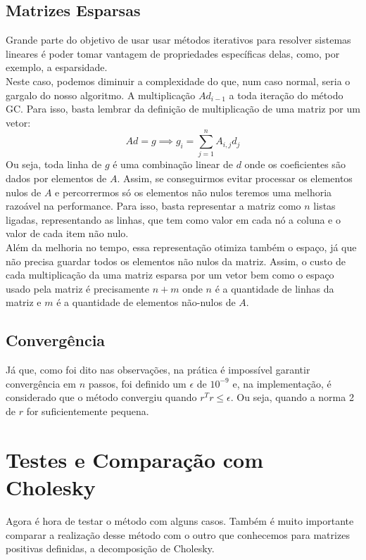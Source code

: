 \documentclass[
10pt, %
a4paper, %
oneside, %
headinclude,footinclude, %
BCOR5mm, %
]{scrartcl}
\begin{document}
\subsection{Matrizes Esparsas}
Grande parte do objetivo de usar usar métodos iterativos para resolver sistemas lineares é poder tomar vantagem de propriedades específicas delas, como, por exemplo, a esparsidade. \\
Neste caso, podemos diminuir a complexidade do que, num caso normal, seria o gargalo do nosso algoritmo. A multiplicação $Ad_{i-1}$ a toda iteração do método GC. Para isso, basta lembrar da definição de multiplicação de uma matriz por um vetor:
$$ Ad = g \implies g_i = \sum\limits_{j=1}^n A_{i,j}d_j $$
Ou seja, toda linha de $g$ é uma combinação linear de $d$ onde os coeficientes são dados por elementos de $A$. Assim, se conseguirmos evitar processar os elementos nulos de $A$ e percorrermos só os elementos não nulos teremos uma melhoria razoável na performance. Para isso, basta representar a matriz como $n$ listas ligadas, representando as linhas, que tem como valor em cada nó a coluna e o valor de cada item não nulo. \\
Além da melhoria no tempo, essa representação otimiza também o espaço, já que não precisa guardar todos os elementos não nulos da matriz. Assim, o custo de cada multiplicação da uma matriz esparsa por um vetor bem como o espaço usado pela matriz é precisamente $n+m$ onde $n$ é a quantidade de linhas da matriz e $m$ é a quantidade de elementos não-nulos de $A$. \\

\subsection{Convergência}
Já que, como foi dito nas observações, na prática é impossível garantir convergência em $n$ passos, foi definido um $\epsilon$ de $10^{-9}$ e, na implementação, é considerado que o método convergiu quando $r^Tr \leq \epsilon$. Ou seja, quando a norma 2 de $r$ for suficientemente pequena. \\

\section{Testes e Comparação com Cholesky}
Agora é hora de testar o método com alguns casos. Também é muito importante comparar a realização desse método com o outro que conhecemos para matrizes positivas definidas, a decomposição de Cholesky. \\
\end{document}
